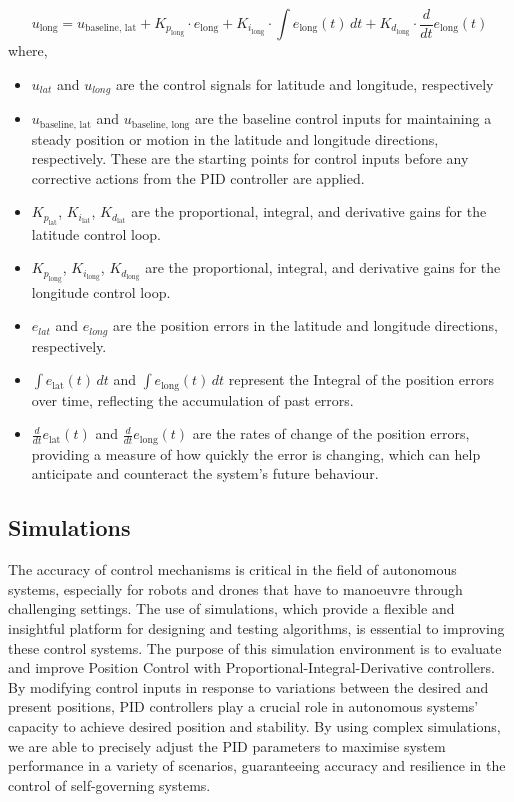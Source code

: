 \documentclass{article}
\begin{document}
\begin{equation}
  u_{\text{long}} = u_{\text{baseline, lat}} + K_{p_{\text{long}}} \cdot e_{\text{long}} + K_{i_{\text{long}}} \cdot \int e_{\text{long}}(t) \, dt + K_{d_{\text{long}}} \cdot \frac{d}{dt}e_{\text{long}}(t)
\end{equation}
where, 
\begin{itemize}
  \item \(u_{lat}\) and \(u_{long}\) are the control signals for latitude and longitude, respectively
  \item \(u_{\text{baseline, lat}}\) and \(u_{\text{baseline, long}}\) are the baseline control inputs for maintaining a steady position or motion in the latitude and longitude directions, respectively. These are the starting points for control inputs before any corrective actions from the PID controller are applied.
  \item \( K_{p_{\text{lat}}}\), \( K_{i_{\text{lat}}}\), \( K_{d_{\text{lat}}}\) are the proportional, integral, and derivative gains for the latitude control loop.
  \item \( K_{p_{\text{long}}}\), \( K_{i_{\text{long}}}\), \( K_{d_{\text{long}}}\) are the proportional, integral, and derivative gains for the longitude control loop.
  \item \(e_{lat}\) and \(e_{long}\) are the position errors in the latitude and longitude directions, respectively.
  \item \(\int e_{\text{lat}}(t) \, dt\) and \(\int e_{\text{long}}(t) \, dt\) represent the Integral of the position errors over time, reflecting the accumulation of past errors.
  \item \(\frac{d}{dt}e_{\text{lat}}(t)\) and \(\frac{d}{dt}e_{\text{long}}(t)\) are the rates of change of the position errors, providing a measure of how quickly the error is changing, which can help anticipate and counteract the system's future behaviour.
\end{itemize}

\subsection{Simulations}
The accuracy of control mechanisms is critical in the field of autonomous systems, especially for robots and drones that have to manoeuvre through challenging settings. The use of simulations, which provide a flexible and insightful platform for designing and testing algorithms, is essential to improving these control systems. 
The purpose of this simulation environment is to evaluate and improve Position Control with Proportional-Integral-Derivative controllers. By modifying control inputs in response to variations between the desired and present positions, PID controllers play a crucial role in autonomous systems' capacity to achieve desired 
position and stability. By using complex simulations, we are able to precisely adjust the PID parameters to maximise system performance in a variety of scenarios, guaranteeing accuracy and resilience in the control of self-governing systems.
\end{document}
